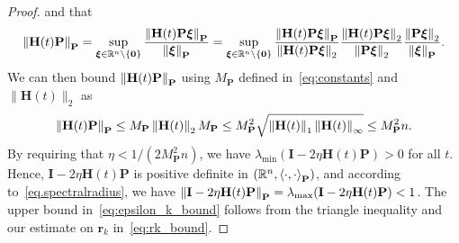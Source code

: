 \begin{proof}
and that 
\begin{equation}\label{eq.mimpsubmult}
    \left\lVert\mathbf{H}(t) \mathbf{P}\right\rVert_{\mathbf{P}} = \sup_{{\boldsymbol{\xi}}\in\mathbb{R}^n \setminus \{\mathbf{0}\}} \frac{\left\lVert\mathbf{H}(t) \mathbf{P} {\boldsymbol{\xi}}\right\rVert_{\mathbf{P}}}{\left\lVert{\boldsymbol{\xi}}\right\rVert_{\mathbf{P}}} = \sup_{{\boldsymbol{\xi}}\in\mathbb{R}^n \setminus \{\mathbf{0}\}}  \frac{\left\lVert\mathbf{H}(t) \mathbf{P} {\boldsymbol{\xi}}\right\rVert_{\mathbf{P}}}{\left\lVert\mathbf{H}(t) \mathbf{P} {\boldsymbol{\xi}}\right\rVert_2} \frac{\left\lVert\mathbf{H}(t) \mathbf{P} {\boldsymbol{\xi}}\right\rVert_2}{\left\lVert \mathbf{P} {\boldsymbol{\xi}}\right\rVert_2} \frac{\left\lVert \mathbf{P} {\boldsymbol{\xi}}\right\rVert_2}{\left\lVert {\boldsymbol{\xi}}\right\rVert_{\mathbf{P}}}.
\end{equation}
We can then bound $\left\lVert\mathbf{H}(t) \mathbf{P}\right\rVert_{\mathbf{P}} $ using $M_{\mathbf{P}}$ defined in~\cref{eq:constants} and $\|\mathbf{H}(t)\|_2$ as 
\begin{equation*}
    \left\lVert\mathbf{H}(t) \mathbf{P}\right\rVert_{\mathbf{P}} \leq M_{\mathbf{P}} \left\lVert\mathbf{H}(t)\right\rVert_{2} M_{\mathbf{P}} \leq M_{\mathbf{P}}^2 \sqrt{\left\lVert\mathbf{H}(t)\right\rVert_1 \left\lVert\mathbf{H}(t)\right\rVert_{\infty}} \leq M_{\mathbf{P}}^2n.
\end{equation*}
By requiring that $\eta < 1/(2M_{\mathbf{P}}^2n)$, we have $\lambda_{\min}({\mathbf{I} - 2\eta \mathbf{H}(t)\mathbf{P}}) > 0$ for all $t$. Hence, $\mathbf{I} - 2\eta \mathbf{H}(t)\mathbf{P}$ is positive definite in $(\mathbb{R}^n, \left\langle \cdot, \cdot \right\rangle_\mathbf{P})$, and according to~\cref{eq.spectralradius}, we have $\left\lVert\mathbf{I} - 2\eta \mathbf{H}(t)\mathbf{P}\right\rVert_{\mathbf{P}} = \lambda_{\max}(\mathbf{I} - 2\eta \mathbf{H}(t)\mathbf{P}) < 1$. The upper bound in~\cref{eq:epsilon_k_bound} follows from the triangle inequality and our estimate on $\mathbf{r}_k$ in~\cref{eq:rk_bound}.
\end{proof}

